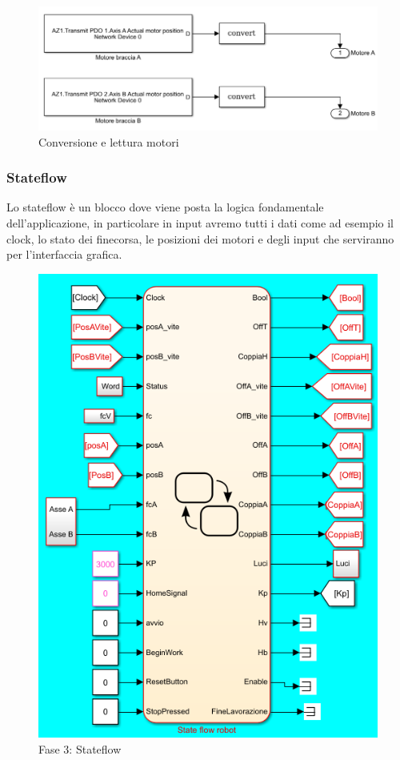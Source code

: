 \begin{figure}[ht]
	\begin{center}
		\includegraphics[scale=0.7]{Immagini/Sperimentale/convertS}
		\caption{Conversione e lettura motori}
		\label{fig:MotorConversion}
	\end{center}
\end{figure}
\subsubsection*{Stateflow}
Lo stateflow è un blocco dove viene posta la logica fondamentale dell'applicazione, in particolare in input avremo tutti i dati come ad esempio il clock, lo stato dei finecorsa, le posizioni dei motori e degli input che serviranno per l'interfaccia grafica. 
\begin{figure}[ht]
	\begin{center}
		\includegraphics[scale=0.7]{Immagini/Sperimentale/sf0}
		\caption{Fase 3: Stateflow}
		\label{fig:Stateflow1}
	\end{center}
\end{figure}
